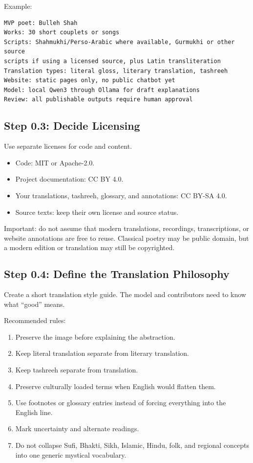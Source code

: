 \documentclass[11pt]{article}
\begin{document}
Example:

\begin{verbatim}
MVP poet: Bulleh Shah
Works: 30 short couplets or songs
Scripts: Shahmukhi/Perso-Arabic where available, Gurmukhi or other source
scripts if using a licensed source, plus Latin transliteration
Translation types: literal gloss, literary translation, tashreeh
Website: static pages only, no public chatbot yet
Model: local Qwen3 through Ollama for draft explanations
Review: all publishable outputs require human approval
\end{verbatim}

\subsection{Step 0.3: Decide Licensing}

Use separate licenses for code and content.

\begin{itemize}
  \item Code: MIT or Apache-2.0.
  \item Project documentation: CC BY 4.0.
  \item Your translations, tashreeh, glossary, and annotations: CC BY-SA 4.0.
  \item Source texts: keep their own license and source status.
\end{itemize}

Important: do not assume that modern translations, recordings, transcriptions,
or website annotations are free to reuse. Classical poetry may be public domain,
but a modern edition or translation may still be copyrighted.

\subsection{Step 0.4: Define the Translation Philosophy}

Create a short translation style guide. The model and contributors need to know
what ``good'' means.

Recommended rules:

\begin{enumerate}
  \item Preserve the image before explaining the abstraction.
  \item Keep literal translation separate from literary translation.
  \item Keep tashreeh separate from translation.
  \item Preserve culturally loaded terms when English would flatten them.
  \item Use footnotes or glossary entries instead of forcing everything into the
  English line.
  \item Mark uncertainty and alternate readings.
  \item Do not collapse Sufi, Bhakti, Sikh, Islamic, Hindu, folk, and regional
  concepts into one generic mystical vocabulary.
\end{enumerate}
\end{document}
